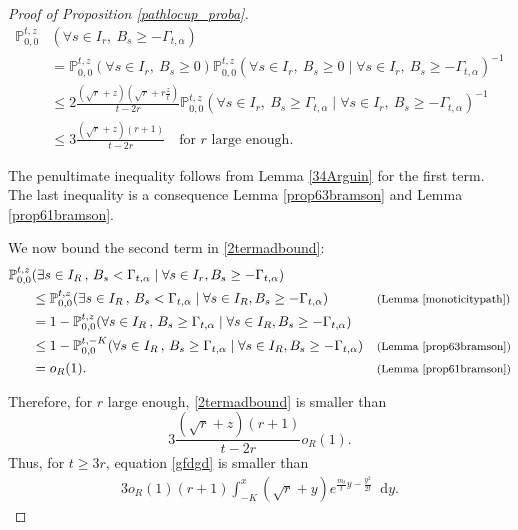 \documentclass{article}
\newcommand{\Prob}{\mathbb{P}}
\begin{document}
\begin{proof}[Proof of Proposition \ref{pathlocup_proba}]
\begin{equation}
\begin{split}
        \Prob_{0,0}^{t,z} &\left( \forall s \in I_r,\ B_s \geq -\Gamma_{t,\alpha} \right) 
        \\ &= \Prob_{0,0}^{t,z} \left( \forall s \in I_r,\ B_s \geq 0 \right)
         \Prob_{0,0}^{t,z} \left( \forall s \in I_r,\ B_s \geq 0 \mid \forall s \in I_r,\ B_s \geq -\Gamma_{t,\alpha} \right)^{-1}
        \\& \leq 2 \frac{\left( \sqrt{r} + z \right)\left( \sqrt{r} + r \frac{z}{t} \right)}{t - 2r} \Prob_{0,0}^{t,z} \left( \forall s \in I_r,\ B_s \geq \Gamma_{t,\alpha} \mid \forall s \in I_r,\ B_s \geq -\Gamma_{t,\alpha} \right)^{-1}
        \\& \leq 3 \frac{\left( \sqrt{r} + z \right)(r + 1)}{t - 2r} \quad \text{for } r \text{ large enough.}
    \end{split}   
\end{equation}

    The penultimate inequality follows from Lemma \ref{34Arguin} for the first term. The last inequality is a consequence Lemma \ref{prop63bramson} and  Lemma \ref{prop61bramson}.  
    
    We now bound the second term in \eqref{2termadbound}:
    \begin{equation}
      \begin{aligned}
        \Prob_{0,0}^{t,z}&(\exists s \in I_R \, , \, B_s < \Gamma_{t,\alpha}  \mid \forall s\in I_r, B_s \geq - \Gamma_{t,\alpha}) & &  \\
               & \leq \Prob_{0,0}^{t,z}(\exists s \in I_R \, , \, B_s <  \Gamma_{t,\alpha} \mid \forall s\in I_R, B_s \geq - \Gamma_{t,\alpha}) & & \text{\footnotesize(Lemma \ref{monoticitypath})}\\
                & = 1-\Prob_{0,0}^{t,z}(\forall s \in I_R \, , \, B_s \geq  \Gamma_{t,\alpha} \mid \forall s\in I_R, B_s \geq - \Gamma_{t,\alpha}) & & \\
                 & \leq 1-\Prob_{0,0}^{t,-K}(\forall s \in I_R \, , \, B_s \geq  \Gamma_{t,\alpha} \mid \forall s\in I_R, B_s \geq - \Gamma_{t,\alpha}) & & \text{\footnotesize(Lemma \ref{prop63bramson})}\\
                 & = o_R(1). & & \text{\footnotesize(Lemma \ref{prop61bramson})}
      \end{aligned}
    \end{equation}
    
    Therefore, for $r$ large enough,  \eqref{2termadbound} is smaller than
    \begin{equation}
        3\frac{\left(\sqrt{r}+z\right)(r+1)}{t-2r}o_R(1).
    \end{equation}
    Thus, for $t\geq 3r$, equation \eqref{gfdgd} is smaller than
    \begin{equation}\label{48}
        \begin{split}
           3o_R(1)(r+1)\int_{-K}^x  (\sqrt{r}+y)e^{\frac{m_t}{t} y -\frac{y^2}{2t}} \mathop{}\!\mathrm{d}y.
    \end{split}
    \end{equation}


\end{proof}
\end{document}
